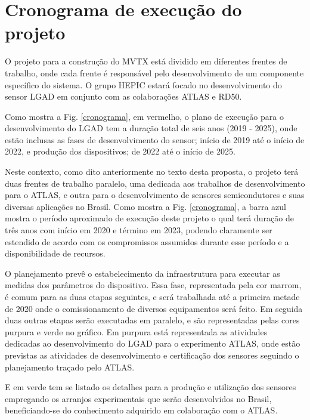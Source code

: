 \chapter{Cronograma de execução do projeto}

O projeto para a construção do MVTX está dividido em diferentes frentes de trabalho, onde cada frente é responsável pelo desenvolvimento de um componente específico do sistema. O grupo HEPIC estará focado no desenvolvimento do sensor LGAD em conjunto com as colaborações ATLAS e RD50. 

Como mostra a Fig. \ref{cronograma}, em vermelho, o plano de execução para o desenvolvimento do LGAD tem a duração total de seis anos (2019 - 2025), onde estão inclusas as fases de desenvolvimento do sensor; início de 2019 até o início de 2022, e produção dos dispositivos; de 2022 até o início de 2025. 

Neste contexto, como dito anteriormente no texto desta proposta, o projeto terá duas frentes de trabalho paralelo, uma dedicada aos trabalhos de desenvolvimento para o ATLAS, e outra para o desenvolvimento de sensores semicondutores e suas diversas aplicações no Brasil. Como mostra a Fig. \ref{cronograma}, a barra azul mostra o período aproximado de execução deste projeto o qual terá duração de três anos com início em 2020 e término em 2023, podendo claramente ser estendido de acordo com os compromissos assumidos durante esse período e a disponibilidade de recursos.

O planejamento prevê o estabelecimento da infraestrutura para executar as medidas dos parâmetros do dispositivo. Essa fase, representada pela cor marrom, é comum para as duas etapas seguintes, e será trabalhada até a primeira metade de 2020 onde o comissionamento de diversos equipamentos será feito. Em seguida duas outras etapas serão executadas em paralelo, e são representadas pelas cores purpura e verde no gráfico. Em purpura está representada as atividades dedicadas ao desenvolvimento do LGAD para o experimento ATLAS, onde estão previstas as atividades de desenvolvimento e certificação dos sensores seguindo o planejamento traçado pelo ATLAS.

E em verde tem se listado os detalhes para a produção e utilização dos sensores empregando os arranjos experimentais que serão desenvolvidos no Brasil, beneficiando-se do conhecimento adquirido em colaboração com o ATLAS.


